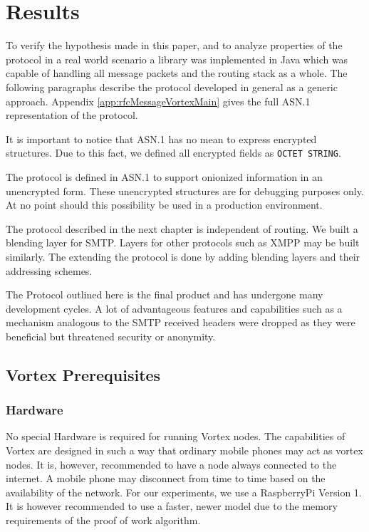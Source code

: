 
\part{Results}
To verify the hypothesis made in this paper, and to analyze properties of the protocol in a real world scenario a library was implemented in Java which was capable of handling all message packets and the routing stack as a whole. The following paragraphs describe the protocol developed in general as a generic approach. Appendix \ref{app:rfcMessageVortexMain} gives the full ASN.1 representation of the protocol. 

It is important to notice that ASN.1 has no mean to express encrypted structures. Due to this fact, we defined all encrypted fields as \verb|OCTET STRING|. 

The protocol is defined in ASN.1 to support onionized information in an unencrypted form. These unencrypted structures are for debugging purposes only. At no point should this possibility be used in a production environment.

The protocol described in the next chapter is independent of routing. We built a blending layer for SMTP. Layers for other protocols such as XMPP may be built similarly. The extending the protocol is done by adding blending layers and their addressing schemes.

The Protocol outlined here is the final product and has undergone many development cycles. A lot of advantageous features and capabilities such as a mechanism analogous to the SMTP received headers were dropped as they were beneficial but threatened security or anonymity.

\chapter{Vortex Prerequisites}
\section{Hardware}
No special Hardware is required for running Vortex nodes. The capabilities of Vortex are designed in such a way that ordinary mobile phones may act as vortex nodes. It is, however, recommended to have a node always connected to the internet. A mobile phone may disconnect from time to time based on the availability of the network. For our experiments, we use a RaspberryPi Version 1. It is however recommended to use a faster, newer model due to the memory requirements of the proof of work algorithm.

